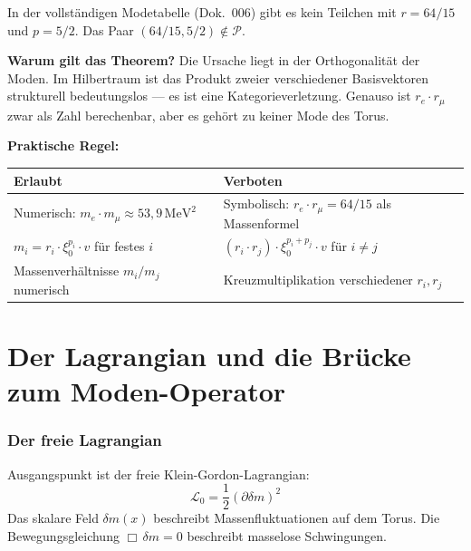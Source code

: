 In der vollständigen Modetabelle (Dok.~006) gibt es kein Teilchen
mit $r = 64/15$ und $p = 5/2$. Das Paar $(64/15, 5/2) \notin \mathcal{P}$.

\textbf{Warum gilt das Theorem?} Die Ursache liegt in der
Orthogonalität der Moden. Im Hilbertraum ist das Produkt zweier
verschiedener Basisvektoren strukturell bedeutungslos — es ist eine
Kategorieverletzung. Genauso ist $r_e \cdot r_\mu$ zwar als Zahl
berechenbar, aber es gehört zu keiner Mode des Torus.

\textbf{Praktische Regel:}

\begin{center}
{\footnotesize
\begin{tabular}{p{5cm}p{5cm}}
\toprule
\textbf{Erlaubt} & \textbf{Verboten} \\
\midrule
Numerisch: $m_e \cdot m_\mu \approx 53{,}9\,\text{MeV}^2$ &
  Symbolisch: $r_e \cdot r_\mu = 64/15$ als Massenformel \\[4pt]
$m_i = r_i \cdot \xi_0^{p_i} \cdot v$ für festes $i$ &
  $(r_i \cdot r_j) \cdot \xi_0^{p_i+p_j} \cdot v$ für $i \neq j$ \\[4pt]
Massenverhältnisse $m_i/m_j$ numerisch &
  Kreuzmultiplikation verschiedener $r_i, r_j$ \\
\bottomrule
\end{tabular}
}
\end{center}

\part{Der Lagrangian und die Brücke zum Moden-Operator}

\section{Der freie Lagrangian}

Ausgangspunkt ist der freie Klein-Gordon-Lagrangian:
\begin{equation}
  \mathcal{L}_0 = \frac{1}{2}(\partial\delta m)^2
\end{equation}
Das skalare Feld $\delta m(x)$ beschreibt Massenfluktuationen auf dem Torus.
Die Bewegungsgleichung $\Box\,\delta m = 0$ beschreibt masselose Schwingungen.

